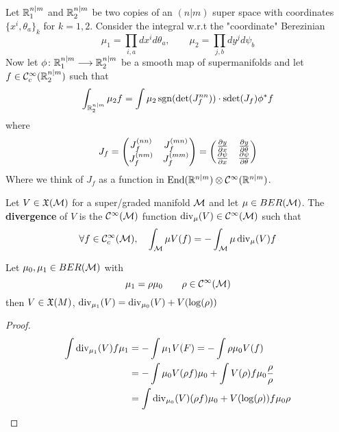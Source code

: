 \begin{rem}
  \begin{theo}
    Let $\mathbb{R}^{n|m}_1$ and $\mathbb{R}^{n|m}_2$ be two copies of an $(n|m)$ super space with coordinates $\{x^i, \theta_a\}_k$ for $k = 1,2$. Consider the integral w.r.t the "coordinate" Berezinian
    \begin{equation}
      \mu_1 = \prod_{i,a} dx^i d\theta_a, \quad \quad \mu_2 = \prod_{j,b} dy^j d\psi_b
    \end{equation}
    Now let $\phi \colon \RR^{n|m}_1 \lra \RR^{n|m}_2$ be a smooth map of supermanifolds and let $f \in \mathcal{C}^{\infty}_c(\mathbb{R}^{n|m}_2)$ such that
    $$ \int_{\RR^{n|m}_2} \mu_2 f = \int \mu_2 \sgn(\det(J_f^{nn})) \cdot \sdet(J_f) \phi^* f $$
    where
    \begin{align}
    J_f =
    \begin{pmatrix}
      J_f^{(nn)} & J_f^{(mn)} \\
      J_f^{(nm)} & J_f^{(mm)}
    \end{pmatrix} =
    \begin{pmatrix}
      \frac{\partial y}{\partial x} & \frac{\partial y}{\partial \theta} \\
      \frac{\partial \psi}{\partial x} & \frac{\partial \psi}{\partial \theta}
    \end{pmatrix}
    \end{align}
    Where we think of $J_f$ as a function in $\operatorname{End}(\mathbb{R}^{n|m}) \otimes \mathcal{C}^{\infty}(\mathbb{R}^{n|m})$.
  \end{theo}

  \begin{definition}
    Let $V \in \mathfrak{X}(\mathcal{M})$ for a super/graded manifold $\mathcal{M}$ and let $\mu \in BER(\mathcal{M})$. The \textbf{divergence} of $V$ is the $\mathcal{C}^{\infty}(\mathcal{M})$ function $\operatorname{div}_\mu(V) \in \mathcal{C}^{\infty}(\mathcal{M})$ such that
    $$ \forall f \in \mathcal{C}^{\infty}_c(\mathcal{M}), \quad \int_{\mathcal{M}} \mu V(f) = - \int_{\mathcal{M}} \mu \operatorname{div}_\mu(V) f$$
  \end{definition}

  \begin{lem}
    Let $\mu_0, \mu_1 \in BER(\mathcal{M})$ with
    $$ \mu_1 = \rho \mu_0 \quad \quad  \rho \in \mathcal{C}^{\infty}(\mathcal{M}) $$
    then $V \in \mathfrak{X}(M)$, $\operatorname{div}_{\mu_1}(V) = \operatorname{div}_{\mu_0}(V) + V(\log(\rho))$
  \begin{proof}~
    \begin{align}
      \int \operatorname{div}_{\mu_1}(V) f\mu_1 &= -\int \mu_1 V(F) = - \int \rho \mu_0 V(f)\\
      &= - \int \mu_0 V(\rho f) \mu_0 + \int V(\rho) f \mu_0 \frac{\rho}{\rho} \\
      &= \int \operatorname{div}_{\mu_0} (V) (\rho f) \mu_0 + V(\log(\rho)) f \mu_0 \rho
    \end{align}
  \end{proof}
  \end{lem}


\end{rem}
